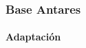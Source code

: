 \documentclass{beamer}
\begin{document}
\begin{frame}
				\frametitle{Base Antares}
				\framesubtitle{Adaptación}
				\begin{columns}
								\begin{column}{0.50\textwidth}
												\\
								\end{column} 
								\begin{column}{0.5\textwidth}

\end{column}
\end{columns}
\end{frame}
\end{document}
